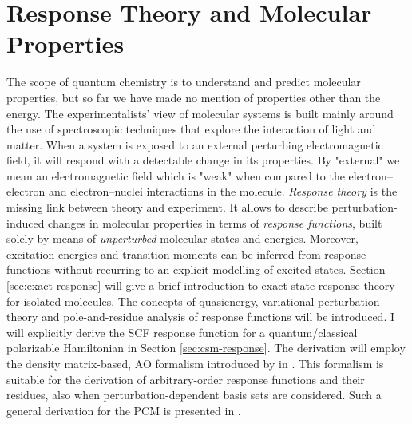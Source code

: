 \chapter{Response Theory and Molecular Properties}\label{ch:molprop}

\begin{epigraphs}
\end{epigraphs}

The scope of quantum chemistry is to understand and predict molecular
properties, but so far we have made no mention of properties other than
the energy.
The experimentalists' view of molecular systems is built mainly around the use
of spectroscopic techniques that explore the interaction of light and matter.
When a system is exposed to an external perturbing electromagnetic field, it will
respond with a detectable change in its properties.\autocite{Pedersen2012-il, Jaszunski2012-wy}
By "external" we mean an electromagnetic field which is "weak" when
compared to the electron--electron and electron--nuclei interactions in
the molecule.
\emph{Response theory} is the missing link between theory and
experiment. It allows to describe perturbation-induced changes in
molecular properties in terms of \emph{response functions}, built solely
by means of \emph{unperturbed} molecular states and energies.
Moreover, excitation energies and transition moments can be inferred
from response functions without recurring to an explicit modelling of
excited states.
Section \ref{sec:exact-response} will give a brief introduction to exact
state response theory for isolated molecules. The concepts of
quasienergy,\autocite{Christiansen1998-pe} variational perturbation
theory\autocite{Helgaker1992-ph} and pole-and-residue
analysis of response functions\autocite{Olsen1985-nr} will be introduced.
I will explicitly derive the \acrshort{SCF} response function for a
quantum/classical polarizable Hamiltonian in Section
\ref{sec:csm-response}. The derivation will employ the
density matrix-based, \acrshort{AO} formalism introduced by
\citeauthor{Thorvaldsen2008-sg} in .
This formalism is suitable for the derivation of arbitrary-order
response functions and their residues, also when perturbation-dependent
basis sets are considered.\autocite{Friese2015-kb, Friese2015-bu}
Such a general derivation for the \acrshort{PCM} is presented in
.

